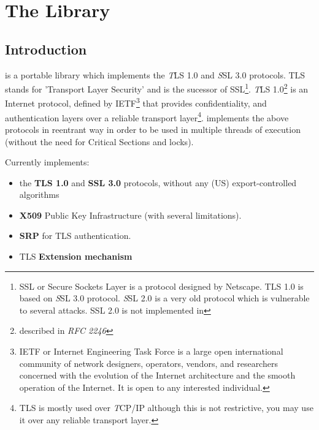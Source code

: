 \documentclass{book}
\begin{document}




\tableofcontents
\newpage
{}
\pagestyle{fancy}

\chapter{The Library}
\section{Introduction}
\par
\gnutls is a portable library which implements the {\emph TLS 1.0} and 
{\emph SSL 3.0} protocols.
TLS stands for 'Transport Layer Security' and is the sucessor of SSL\footnote{
SSL or Secure Sockets Layer is a protocol designed by Netscape. TLS 1.0 is based on
{\emph SSL 3.0} protocol. {\emph SSL 2.0} is a very old protocol which is vulnerable 
to several attacks. SSL 2.0 is not implemented in \gnutls}.
{\emph TLS 1.0}\footnote{described in {\it RFC 2246}} is an Internet protocol,
defined by IETF\footnote{IETF or Internet Engineering Task Force 
is a large open international community of network
designers, operators, vendors, and researchers concerned with the evolution of 
the Internet architecture and the smooth operation of the Internet. It is open to any interested individual.}
that provides confidentiality, and authentication layers over a {reliable
transport layer}\footnote{TLS is mostly used over {\emph TCP/IP} although this is not restrictive, you may
use it over any reliable transport layer.}. \gnutls implements the
above protocols in reentrant way in order to be used in multiple threads of 
execution (without the need for Critical Sections and locks).

\par
Currently \gnutls implements:
\begin{itemize}
 \item the {\bf TLS 1.0} and {\bf{ SSL 3.0}} protocols, without any (US) export-controlled algorithms
 \item {\bf X509} Public Key Infrastructure (with several limitations).
 \item {\bf SRP} for TLS authentication.
 \item TLS {\bf Extension mechanism}
\end{itemize}
\end{document}
